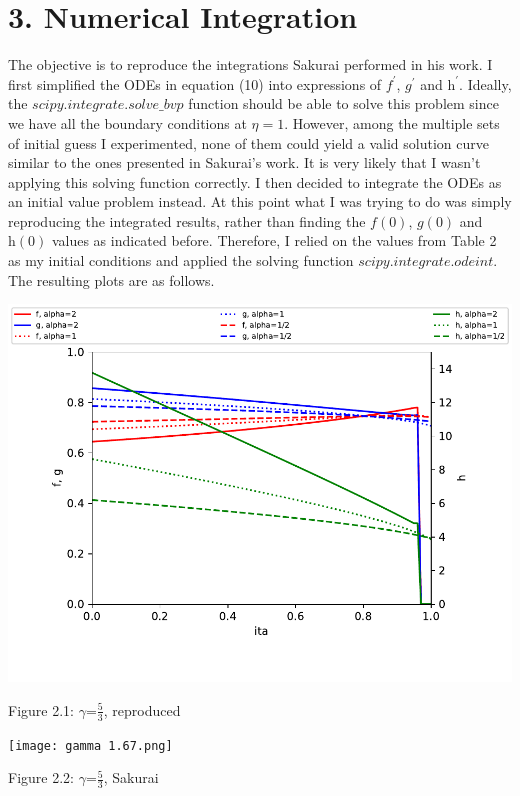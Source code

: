 \documentclass{article}
\begin{document}
\section*{3. Numerical Integration}
The objective is to reproduce the integrations Sakurai performed in his work. I first simplified the ODEs in equation (10) into expressions of $\textit{f}^{'}$, $\textit{g}^{'}$ and $\textit{h}^{'}$. Ideally, the $scipy.integrate.solve\_bvp$ function should be able to solve this problem since we have all the boundary conditions at $\eta=1$. 
\bigbreak
However, among the multiple sets of initial guess I experimented, none of them could yield a valid solution curve similar to the ones presented in Sakurai's work. It is very likely that I wasn't applying this solving function correctly. I then decided to integrate the ODEs as an initial value problem instead. At this point what I was trying to do was simply reproducing the integrated results, rather than finding the $\textit{f}(0)$, $\textit{g}(0)$ and $\textit{h}(0)$ values as indicated before. Therefore, I relied on the values from Table 2 as my initial conditions and applied the solving function $scipy.integrate.odeint$. The resulting plots are as follows.
\newpage
\centerline{\includegraphics[scale=0.8]{gamma 1.67.pdf}}
\centerline{Figure 2.1: $\gamma$=$\frac{5}{3}$, reproduced}
\centerline{\texttt{[image: gamma 1.67.png]}}
\centerline{Figure 2.2: $\gamma$=$\frac{5}{3}$, Sakurai}
\end{document}
